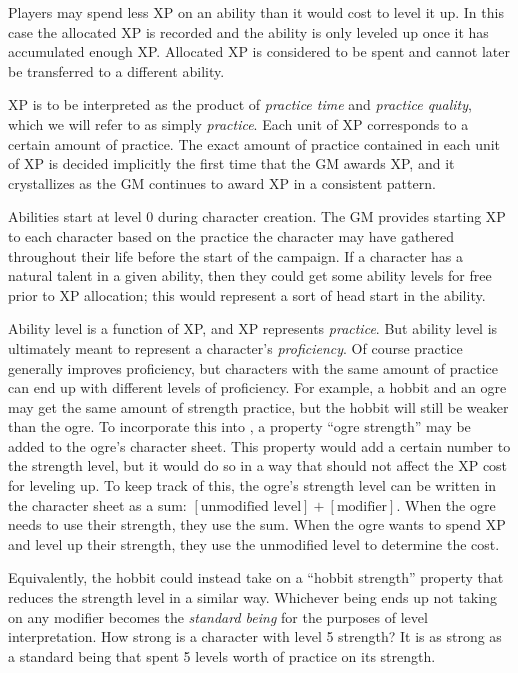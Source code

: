 Players may spend less XP on an ability than it would cost to level it up.
In this case the allocated XP is recorded and the ability is only leveled up once it has accumulated enough XP.
Allocated XP is considered to be spent and cannot later be transferred to a different ability.

XP is to be interpreted as the product of \emph{practice time} and \emph{practice quality}, which we will refer to as simply \emph{practice}.
Each unit of XP corresponds to a certain amount of practice.
The exact amount of practice contained in each unit of XP is decided implicitly the first time that the GM awards XP,
and it crystallizes as the GM continues to award XP in a consistent pattern.

Abilities start at level 0 during character creation.
The GM provides starting XP to each character based on the practice the character may have gathered throughout their life before the start of the campaign.
If a character has a natural talent in a given ability,
then they could get some ability levels for free prior to XP allocation; this would represent a sort of head start in the ability.

Ability level is a function of XP, and XP represents \emph{practice}.
But ability level is ultimately meant to represent a character's \emph{proficiency}.
Of course practice generally improves proficiency, but characters with the same amount of practice can end up with different levels of proficiency.
For example, a hobbit and an ogre may get the same amount of strength practice, but the hobbit will still be weaker than the ogre.
To incorporate this into \peupfudge{}, a property ``ogre strength'' may be added to the ogre’s character sheet.
This property would add a certain number to the strength level, but it would do so in a way that should not affect the XP cost for leveling up.
To keep track of this, the ogre’s strength level can be written in the character sheet as a sum: 
$[\textrm{unmodified level}] + [\textrm{modifier}]$.
When the ogre needs to use their strength, they use the sum.
When the ogre wants to spend XP and level up their strength, they use the unmodified level to determine the cost.

Equivalently, the hobbit could instead take on a ``hobbit strength'' property that reduces the strength level in a similar way.
Whichever being ends up not taking on any modifier becomes the \emph{standard being} for the purposes of level interpretation.
How strong is a character with level 5 strength?
It is as strong as a standard being that spent 5 levels worth of practice on its strength.

